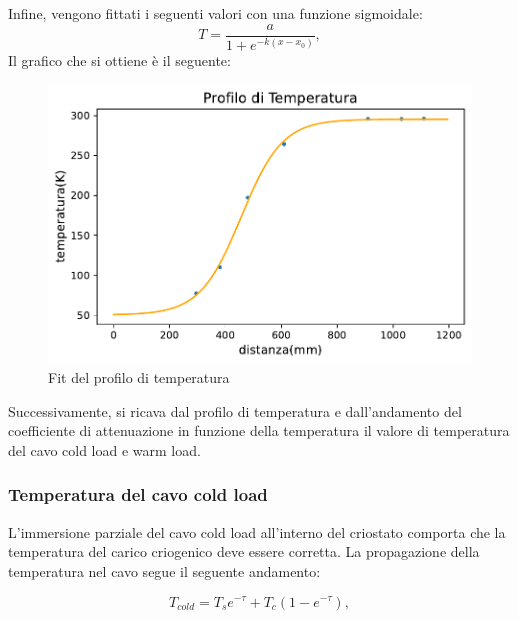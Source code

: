 Infine, vengono fittati i seguenti valori con una funzione sigmoidale:
\begin{equation}
T= \dfrac{a}{1+e^{-k(x-x_{0})}},
\end{equation}
Il grafico che si ottiene è il seguente:

\begin{figure}[H]
	\centering
	\includegraphics[scale=0.8]{Profilo_temperatura.pdf}
	\caption{Fit del profilo di temperatura}
    	\label{fig:Profilo_temperatura}
\end{figure}

Successivamente, si ricava dal profilo di  temperatura e dall'andamento del coefficiente di attenuazione in funzione della temperatura il valore di temperatura del cavo cold load e warm load.


\subsubsection{Temperatura del cavo cold load}
\label{ssec:Temperatura del cavo cold load}

L'immersione parziale del cavo cold load all'interno del criostato comporta che la temperatura del carico criogenico deve essere corretta. La propagazione della temperatura nel cavo segue il seguente andamento:

\begin{equation}
T_{cold}= T_{s}e^{-\tau} + T_{c}(1-e^{-\tau}),
\label{Formula ricorsiva}
\end{equation}

